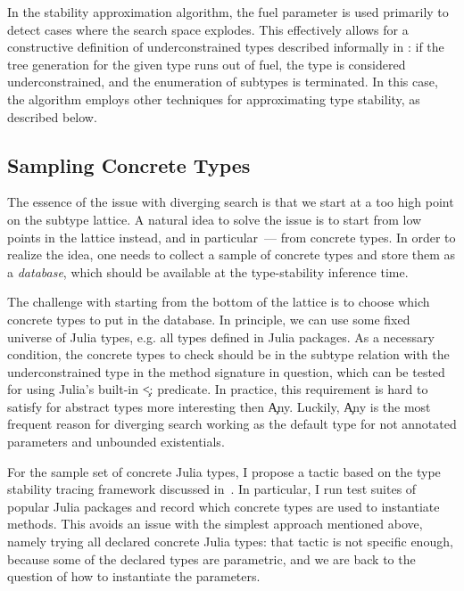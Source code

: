 In the stability approximation algorithm, the fuel parameter
is used primarily to detect cases where the search space explodes.
This effectively allows for a
constructive definition of underconstrained types described informally in
: if the tree generation for the given type runs out
of fuel, the type is considered underconstrained, and the enumeration
of subtypes is terminated. In this case, the algorithm employs other techniques
for approximating type stability, as described below.

\subsection{Sampling Concrete Types}

The essence of the issue with diverging search is that we start at a too high
point on the subtype lattice. A natural idea to solve the issue is to start from
low points in the lattice instead, and in particular~--- from concrete types.
In order to realize the idea, one needs to collect a sample of concrete types
and store them as a \emph{database}, which should be available at the
type-stability inference time.

The challenge with starting from the bottom of the lattice is to choose which concrete
types to put in the database.
In principle, we can use some fixed universe of Julia types, e.g. all types defined
in Julia packages. As a necessary condition, the concrete types to check should
be in the subtype relation with the underconstrained type in the method
signature in question, which can be tested for using Julia's built-in \c{<:}
predicate. In practice, this requirement is hard to satisfy for abstract types
more interesting then \c{Any}. Luckily, \c{Any} is the most frequent reason for
diverging search working as the default type for not annotated parameters and
unbounded existentials.

For the sample set of concrete Julia types, I propose a tactic based on the type
stability tracing framework discussed in~. In
particular, I run test suites of popular Julia packages and record which
concrete types are used to instantiate methods.
This avoids an issue with the simplest approach mentioned above, namely trying
all declared concrete Julia types: that tactic is not specific enough,
because some of the declared types are parametric, and we are back to the
question of how to instantiate the parameters.

